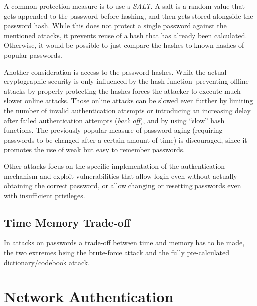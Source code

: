A common protection measure is to use a \emph{SALT}. A salt is a random value
that gets appended to the password before hashing, and then gets stored
alongside the password hash. While this does not protect a single password
against the mentioned attacks, it prevents reuse of a hash that has already been
calculated. Otherwise, it would be possible to just compare the hashes to known
hashes of popular passwords.

Another consideration is access to the password hashes. While the actual
cryptographic security is only influenced by the hash function, preventing
offline attacks by properly protecting the hashes forces the attacker to execute
much slower online attacks. Those online attacks can be slowed even further by
limiting the number of invalid authentication attempts or introducing an
increasing delay after failed authentication attempts (\textit{back off}), and
by using ``slow'' hash functions. The previously popular measure of password
aging (requiring passwords to be changed after a certain amount of time) is
discouraged, since it promotes the use of weak but easy to remember passwords.

Other attacks focus on the specific implementation of the authentication
mechanism and exploit vulnerabilities that allow login even without actually
obtaining the correct password, or allow changing or resetting passwords even
with insufficient privileges.

\subsection{Time Memory Trade-off}
In attacks on passwords a trade-off between time and memory has to be made, the
two extremes being the brute-force attack and the fully pre-calculated
dictionary/codebook attack.


\section{Network Authentication}
